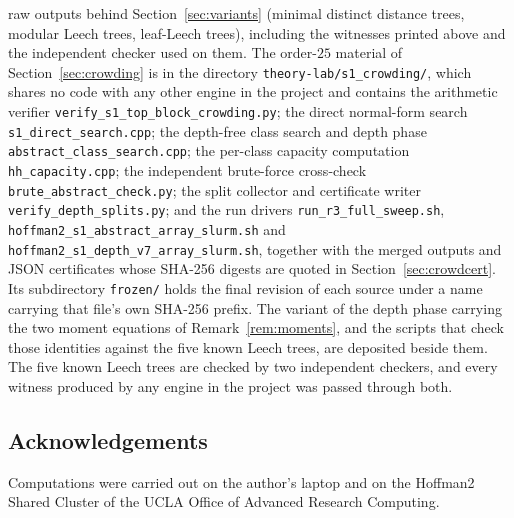 \documentclass[11pt,a4paper]{article}
\theoremstyle{plain}
\theoremstyle{remark}
\newcommand{\file}[1]{\texttt{#1}}
\begin{document}
raw outputs behind Section~\ref{sec:variants} (minimal distinct distance trees,
modular Leech trees, leaf-Leech trees), including the witnesses printed above and
the independent checker used on them.  The order-$25$ material of
Section~\ref{sec:crowding} is in the directory
\file{theory-lab/s1\_crowding/}, which shares no code with any other engine in
the project and contains the arithmetic verifier
\file{verify\_s1\_top\_block\_crowding.py}; the direct normal-form search
\file{s1\_direct\_search.cpp}; the depth-free class search and depth phase
\file{abstract\_class\_search.cpp}; the per-class capacity computation
\file{hh\_capacity.cpp}; the independent brute-force cross-check
\file{brute\_abstract\_check.py}; the split collector and certificate writer
\file{verify\_depth\_splits.py}; and the run drivers
\file{run\_r3\_full\_sweep.sh},
\file{hoffman2\_s1\_abstract\_array\_slurm.sh} and
\file{hoffman2\_s1\_depth\_v7\_array\_slurm.sh}, together with the merged
outputs and JSON certificates whose SHA-256 digests are quoted in
Section~\ref{sec:crowdcert}.  Its subdirectory \file{frozen/} holds the final
revision of each source under a name carrying that file's own SHA-256 prefix.
The variant of the depth phase carrying the two moment equations of
Remark~\ref{rem:moments}, and the scripts that check those identities against
the five known Leech trees, are deposited beside them.  The five known Leech trees are checked by
two independent checkers, and every witness produced by any engine in the project
was passed through both.

\subsection*{Acknowledgements}
Computations were carried out on the author's laptop and on the Hoffman2
Shared Cluster of the UCLA Office of Advanced Research Computing.



\end{document}
